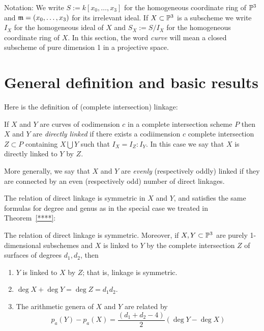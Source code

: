Notation:  We write $S := k[x_0,\dots,x_3]$ for the homogeneous coordinate ring of ${\mathbb P}^3$ and $\mathfrak m = (x_0,\dots,x_3)$ for its
irrelevant ideal. If $X\subset {\mathbb P}^3$ is a subscheme we write $I_X$ for the homogeneous ideal of $X$ and $S_X:=S/I_X$ for the homogeneous coordinate ring of $X$.  In this section, the word \emph{curve} will mean a closed subscheme of pure dimension 1 in a projective space.

\section{General definition and basic results}

Here is the definition of (complete intersection) linkage:
\begin{definition}
If $X$ and $Y$ are curves  of codimension $c$ in a complete intersection scheme $P$ then $X$ and $Y$ are \emph{directly linked} if there exists a codiimension $c$ complete intersection $Z \subset P$ containing $X\bigcup Y$ such that $I_{X} = I_{Z}:I_{Y}$. In this case we say that $X$ is directly linked to $Y$ by $Z$. 

More generally, we say that $X$ and $Y$ are \emph{evenly} (respectively oddly) linked if they are
connected by an even (respectively odd) number of direct linkages.\end{definition}

The relation of direct linkage is symmetric in $X$ and $Y$, and satisfies the same formulas for degree and genus as in the special case we treated in Theorem~\ref{****}:

\begin{theorem}\label{justification of general linkage} The relation of direct linkage is symmetric. Moreover, if $X,Y\subset {\mathbb P}^{3}$ are purely 1-dimensional subschemes and $X$ is linked to $Y$ by the complete intersection $Z$ of surfaces of degrees $d_{1}, d_{2}$, then
\begin{enumerate}
\item $Y$ is linked to $X$ by $Z$; that is, linkage is symmetric.
 \item $\deg X+\deg Y = \deg Z = d_{1}d_{2}$.
 \item  The arithmetic genera of $X$ and $Y$ are related by
$$
p_{a}(Y) - p_{a}(X) =\frac{(d_{1}+d_{2}-4)}{2} (\deg Y - \deg X)
$$
\end{enumerate}
 \end{theorem}
 
